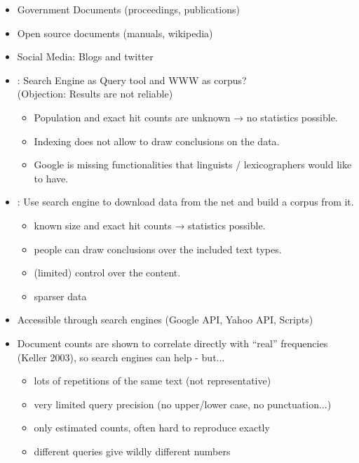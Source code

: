 \documentclass[a4paper,landscape,headrule,footrule,xetex]{foils}
\begin{document}
\begin{itemize}
\item Government Documents (proceedings, publications)
\item Open source documents (manuals, wikipedia)
\item Social Media:  Blogs and twitter
\end{itemize}

\begin{itemize}
\item {}: Search Engine as Query tool and WWW as corpus?
\\  (Objection: Results are not reliable)
\begin{itemize}
\item Population and exact hit counts are unknown → no statistics
possible.
\item Indexing does not allow to draw conclusions on the data.
\item[\Bad] Google is missing functionalities that linguists /
lexicographers would like to have.
\end{itemize}
\item {}: Use search engine to download data from the
net and build a corpus from it.
\begin{itemize}
\item known size and exact hit counts → statistics possible.
\item people can draw conclusions over the included text types.
\item (limited) control over the content.
\item[\Bad] sparser data
\end{itemize}
\end{itemize}

\begin{itemize}
\item Accessible through search engines (Google API, Yahoo API, Scripts)

\item Document counts are shown to correlate directly with ``real''
  frequencies (Keller 2003), so search engines can help - but...
  \begin{itemize}
  \item lots of repetitions of the same text (not representative)
  \item very limited query precision (no upper/lower case, no punctuation...)
  \item only estimated counts, often hard to reproduce exactly
  \item different queries give wildly different numbers
  \end{itemize}
\end{itemize}
\end{document}
